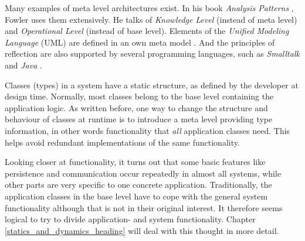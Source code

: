 Many examples of meta level architectures exist. In his book
\emph{Analysis Patterns} \cite{fowler1997}, Fowler uses them extensively.
He talks of \emph{Knowledge Level} (instead of meta level) and
\emph{Operational Level} (instead of base level). Elements of the
\emph{Unified Modeling Language} (UML) are defined in an own meta model
\cite{uml}. And the principles of reflection are also supported by several
programming languages, such as \emph{Smalltalk} \cite{smalltalk} and
\emph{Java} \cite{java}.

Classes (types) in a system have a static structure, as defined by the developer
at design time. Normally, most classes belong to the base level containing the
application logic. As written before, one way to change the structure and
behaviour of classes at runtime is to introduce a meta level providing type
information, in other words functionality that \emph{all} application classes
need. This helps avoid redundant implementations of the same functionality.

Looking closer at functionality, it turns out that some basic features like
persistence and communication occur repeatedly in almost all systems, while
other parts are very specific to one concrete application. Traditionally, the
application classes in the base level have to cope with the general system
functionality although that is not in their original interest. It therefore
seems logical to try to divide application- and system functionality. Chapter
\ref{statics_and_dynamics_heading} will deal with this thought in more detail.
